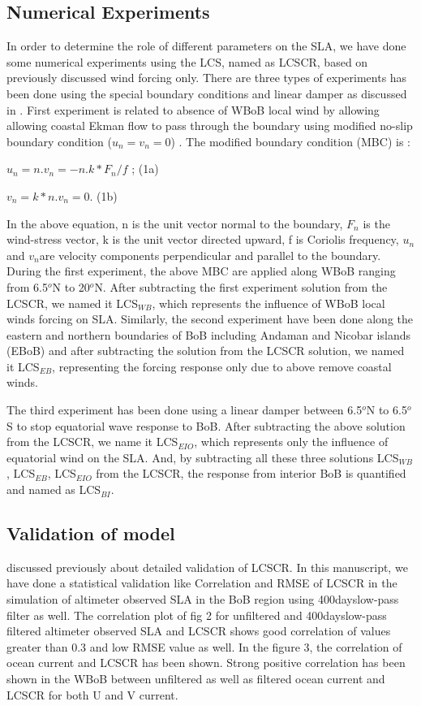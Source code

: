 \documentclass[review]{elsarticle}
\begin{document}
\subsection{Numerical Experiments}
In order to determine the role of different parameters on the SLA, we have done some numerical experiments using the LCS, named as LCSCR, based on previously discussed wind forcing only. There are three types of experiments has been done using the special boundary conditions and linear damper as discussed in \cite{mccreary1996dynamics, mukherjee2017numerical, mukherjee2019signature}. First experiment is related to absence of WBoB local wind by allowing allowing coastal Ekman flow to pass through the boundary using modified no-slip boundary condition ($u_n=v_n=0$) . The modified boundary condition (MBC) is :
\par
$u_n=n.v_n=-n.k * F_n/f$ ;  (1a)
\par
$v_n=k* n.v_n=0$.   (1b)

In the above equation, n is the unit vector normal to the boundary, $F_n$ is the wind-stress vector, k is the unit vector directed upward, f is Coriolis frequency, $u_n$ and $v_n$are velocity components perpendicular and parallel to the boundary. During the first experiment, the above MBC are applied along WBoB ranging from 6.5$^o$N to 20$^o$N. After subtracting the first experiment solution from the LCSCR, we named it LCS$_{WB}$, which represents the influence of WBoB local winds forcing on SLA. Similarly, the second experiment have been done along the eastern and northern boundaries of  BoB including Andaman and Nicobar islands (EBoB)  and after subtracting the solution from the LCSCR solution, we named it LCS$_{EB}$, representing the forcing response only due to above remove coastal winds.

The third experiment has been done using a linear damper between 6.5$^o$N to 6.5$^o$S to stop equatorial wave response to BoB. After subtracting the above solution from the LCSCR, we name it LCS$_{EIO}$, which represents only the influence of equatorial wind on the SLA. And, by subtracting all these three solutions LCS$_{WB}$, LCS$_{EB}$, LCS$_{EIO}$ from the LCSCR, the response from interior BoB is quantified and named as LCS$_{BI}$.   

\subsection{Validation of model}
\cite{shankar2010minima,aparna2012signatures,mukherjee2017numerical,mukherjee2019signature} discussed previously about detailed validation of LCSCR. In this manuscript, we have done a statistical validation like Correlation and RMSE of LCSCR in the simulation of altimeter observed SLA in the BoB region using 400dayslow-pass filter as well. The correlation plot of fig 2 for unfiltered and 400dayslow-pass filtered altimeter observed SLA and LCSCR shows good correlation of values greater than 0.3 and low RMSE value as well. 
In the figure 3, the correlation of ocean current and LCSCR has been shown. Strong positive correlation has been shown in the WBoB between unfiltered as well as filtered ocean current and LCSCR for both U and V current. 
\end{document}
